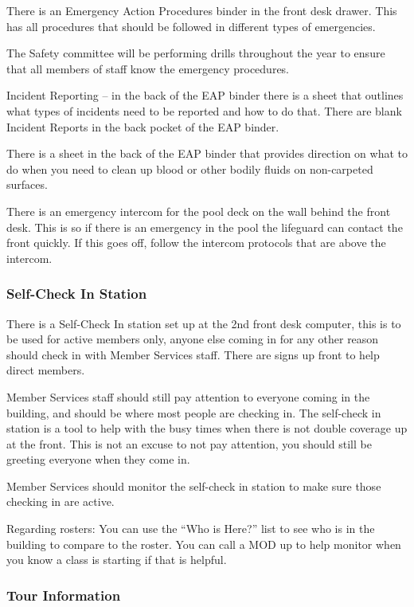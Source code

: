 \documentclass[
]{report}
\begin{document}
There is an Emergency Action Procedures binder in the front desk drawer.
This has all procedures that should be followed in different types of
emergencies.

The Safety committee will be performing drills throughout the year to
ensure that all members of staff know the emergency procedures.

Incident Reporting -- in the back of the EAP binder there is a sheet
that outlines what types of incidents need to be reported and how to do
that. There are blank Incident Reports in the back pocket of the EAP
binder.

There is a sheet in the back of the EAP binder that provides direction
on what to do when you need to clean up blood or other bodily fluids on
non-carpeted surfaces.

There is an emergency intercom for the pool deck on the wall behind the
front desk. This is so if there is an emergency in the pool the
lifeguard can contact the front quickly. If this goes off, follow the
intercom protocols that are above the intercom.

\hypertarget{self-check-in-station}{%
\subsubsection{Self-Check In Station}\label{self-check-in-station}}

There is a Self-Check In station set up at the 2nd front desk computer,
this is to be used for active members only, anyone else coming in for
any other reason should check in with Member Services staff. There are
signs up front to help direct members.

Member Services staff should still pay attention to everyone coming in
the building, and should be where most people are checking in. The
self-check in station is a tool to help with the busy times when there
is not double coverage up at the front. This is not an excuse to not pay
attention, you should still be greeting everyone when they come in.

Member Services should monitor the self-check in station to make sure
those checking in are active.

Regarding rosters: You can use the ``Who is Here?'' list to see who is
in the building to compare to the roster. You can call a MOD up to help
monitor when you know a class is starting if that is helpful.

\hypertarget{tour-information}{%
\subsubsection{Tour Information}\label{tour-information}}
\end{document}
